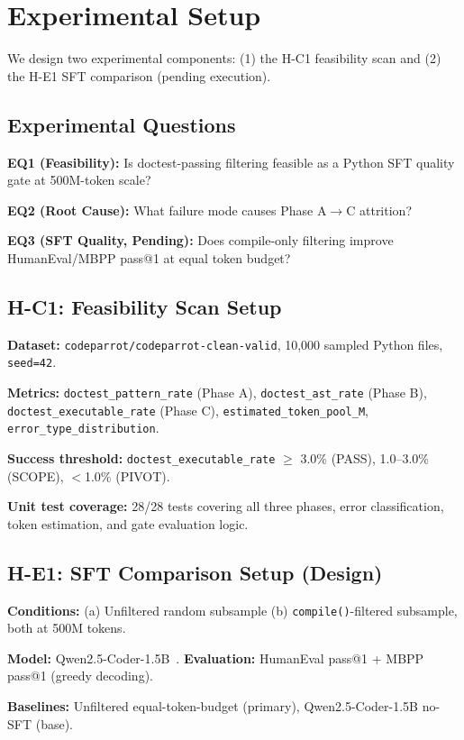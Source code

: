 \section{Experimental Setup}
\label{sec:setup}

We design two experimental components: (1) the H-C1 feasibility scan and (2) the H-E1
SFT comparison (pending execution).

\subsection{Experimental Questions}

\textbf{EQ1 (Feasibility):} Is doctest-passing filtering feasible as a Python SFT quality
gate at 500M-token scale?

\textbf{EQ2 (Root Cause):} What failure mode causes Phase A$\rightarrow$C attrition?

\textbf{EQ3 (SFT Quality, Pending):} Does compile-only filtering improve HumanEval/MBPP
pass@1 at equal token budget?

\subsection{H-C1: Feasibility Scan Setup}

\textbf{Dataset:} \texttt{codeparrot/codeparrot-clean-valid}, 10,000 sampled Python files, \texttt{seed=42}.

\textbf{Metrics:} \texttt{doctest\_pattern\_rate} (Phase A), \texttt{doctest\_ast\_rate}
(Phase B), \texttt{doctest\_executable\_rate} (Phase C), \texttt{estimated\_token\_pool\_M},
\texttt{error\_type\_distribution}.

\textbf{Success threshold:} \texttt{doctest\_executable\_rate} $\geq$ 3.0\% (PASS),
1.0--3.0\% (SCOPE), $<$1.0\% (PIVOT).

\textbf{Unit test coverage:} 28/28 tests covering all three phases, error classification,
token estimation, and gate evaluation logic.

\subsection{H-E1: SFT Comparison Setup (Design)}

\textbf{Conditions:} (a) Unfiltered random subsample (b) \texttt{compile()}-filtered subsample,
both at 500M tokens.

\textbf{Model:} Qwen2.5-Coder-1.5B~\cite{Hui2024Qwen25Coder}.
\textbf{Evaluation:} HumanEval pass@1 + MBPP pass@1 (greedy decoding).

\textbf{Baselines:} Unfiltered equal-token-budget (primary), Qwen2.5-Coder-1.5B no-SFT (base).

